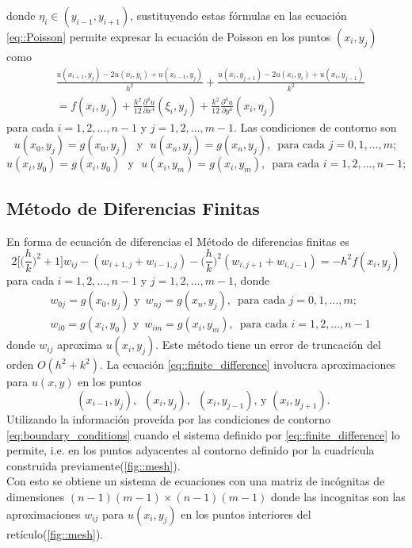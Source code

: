 \documentclass[a4paper]{article}
\begin{document}
donde $\eta_i \in (y_{i-1},y_{i+1})$, sustituyendo estas fórmulas en las ecuación \ref{eq::Poisson} permite expresar la ecuación de Poisson en los puntos $(x_i,y_j)$ como
\begin{equation}
\begin{aligned}
&\frac{u(x_{i+1},y_j)-2u(x_i,y_i)+u(x_{i-1},y_j)}{h^2}+\frac{u(x_{i},y_{j+1})-2u(x_i,y_i)+u(x_{i},y_{j-1})}{k^2}\\
&=f(x_i,y_j)+\frac{h^2}{12}\frac{\partial^4 u}{\partial x^4}(\xi_i,y_j)+\frac{k^2}{12}\frac{\partial^4 u}{\partial y^4}(x_i,\eta_j)
\end{aligned}
\end{equation}
para cada $i=1,2,\hdots,n-1$ y $j=1,2,\hdots,m-1$. Las condiciones de contorno son
\begin{equation*}
u(x_0,y_j)=g(x_0,y_j)\,\, \text{ y } \,\, u(x_n,y_j)=g(x_n,y_j),\,\,\, \text{para cada }j=0,1,\hdots,m;
\end{equation*}
\begin{equation*}
u(x_i,y_0)=g(x_i,y_0)\,\, \text{ y } \,\, u(x_i,y_m)=g(x_i,y_m),\,\,\, \text{para cada }i=1,2,\hdots,n-1;
\end{equation*}
\subsection{Método de Diferencias Finitas}
En forma de ecuación de diferencias el Método de diferencias finitas es
\begin{equation}\label{eq::finite_difference}
2\Bigg[\Bigg(\frac{h}{k}\Bigg)^2 +1  \Bigg]w_{ij}-(w_{i+1,j}+w_{i-1,j})-\Bigg(\frac{h}{k}\Bigg)^2(w_{i,j+1}+w_{i,j-1})=-h^2 f(x_i,y_j)
\end{equation}
para cada $i=1,2,\hdots,n-1$ y $j=1,2,\hdots,m-1$, donde
\begin{equation}\label{eq:boundary_conditions}
\begin{aligned}
&w_{0j}=g(x_0,y_j)\,\,\text{y }\, w_{nj}=g(x_n,y_j),\,\,\, \text{para cada } j=0,1,\hdots,m;\\
&w_{i0}=g(x_i,y_0)\,\,\text{y }\, w_{im}=g(x_i,y_m),\,\,\, \text{para cada } i=1,2,\hdots,n-1
\end{aligned}
\end{equation}
donde $w_{ij}$ aproxima $u(x_i,y_j)$. Este método tiene un error de truncación del orden $O(h^2+k^2)$. La ecuación \ref{eq::finite_difference} involucra aproximaciones para $u(x,y)$ en los puntos
\begin{equation*}
(x_{i-1},y_{j}),\,\,\,(x_{i},y_{j}),\,\,\,(x_{i},y_{j-1}),\,\text{y}\,\,(x_{i},y_{j+1}).\,\,\,
\end{equation*}
Utilizando la información proveída por las condiciones de contorno \ref{eq:boundary_conditions} cuando el sistema definido por \ref{eq::finite_difference} lo permite, i.e. en los puntos adyacentes al contorno definido por la cuadrícula construida previamente(\ref{fig::mesh}).\\ Con esto se obtiene un sistema de ecuaciones con una matriz de incógnitas de dimensiones $(n-1)(m-1)\times(n-1)(m-1)$ donde las incognitas son las aproximaciones $w_{ij}$ para $u(x_i,y_j)$ en los puntos interiores del retículo(\ref{fig::mesh}).\\
\end{document}
